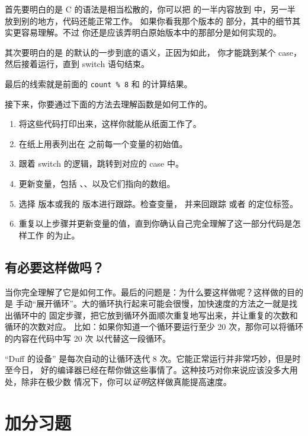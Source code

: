 首先要明白的是 C 的语法是相当松散的，你可以把  的一半内容放到 
 中，另一半放到别的地方，代码还能正常工作。
如果你看我那个版本的  部分，其中的细节其实更容易理解。不过
你还是应该弄明白原始版本中的那部分是如何实现的。

其次要明白的是  的默认的一步到底的语义，正因为如此，
你才能跳到某个 case，然后接着运行，直到 switch 语句结束。

最后的线索就是前面的 \verb|count % 8| 和  的计算结果。

接下来，你要通过下面的方法去理解函数是如何工作的。

\begin{enumerate}
\item 将这些代码打印出来，这样你就能从纸面工作了。
\item 在纸上用表列出在  之前每一个变量的初始值。
\item 跟着 switch 的逻辑，跳转到对应的 case 中。
\item 更新变量，包括 、、以及它们指向的数组。
\item 选择 版本或我的  版本进行跟踪。检查变量，
	并来回跟踪  或者  的定位标签。
\item 重复以上步骤并更新变量的值，直到你确认自己完全理解了这一部分代码是怎样工作
的为止。
\end{enumerate}

\subsection{有必要这样做吗？}

当你完全理解了它是如何工作。最后的问题是：为什么要这样做呢？这样做的目的是
手动“展开循环”。大的循环执行起来可能会很慢，加快速度的方法之一就是找出循环中的
固定步骤，把它放到循环外面顺次重复地写出来，并让重复的次数和循环的次数对应。
比如：如果你知道一个循环要运行至少 20 次，那你可以将循环的内容在代码中写 20 次
以代替这一段循环。

“Duff 的设备” 是每次自动的让循环迭代 8 次。它能正常运行并非常巧妙，但是时至今日，
好的编译器已经在帮你做这些事情了。这种技巧对你来说应该没多大用处，除非在极少数
情况下，你可以\emph{证明}这样做真能提高速度。

\section{加分习题}

